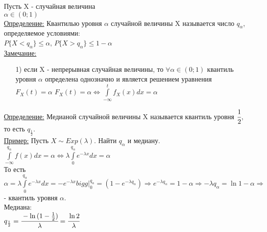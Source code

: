 

Пусть X - случайная величина\\
$\alpha \in (0;1)$\\

\underline{Определение:} Квантилью уровня $\alpha$ случайной величины X называется число $q_\alpha$, определяемое условиями:\\
$P\{X < q_\alpha\} \leqslant \alpha$, $P\{X > q_\alpha\} \leqslant 1 - \alpha$\\


\underline{Замечание:}\\
\begin{enumerate}
	\item[1)] если X - непрерывная случайная величины, то $\forall \alpha \in (0;1)$ квантиль уровня $\alpha$ определена однозначно и является решением уравнения\\
	$F_X(t) = \alpha$
	$\displaystyle  F_X(t) = \alpha \Leftrightarrow \int\limits_{-\infty}^t f_X(x) dx = \alpha$\\
\end{enumerate}


\underline{Определение:} Медианой случайной величины X называется квантиль уровня $\cfrac12$, то есть $q_{\frac12}$.\\


\underline{Пример:} Пусть $X \sim Exp(\lambda)$. Найти $q_\alpha$ и медиану.\\
$\displaystyle  \int\limits_{-\infty}^{q_\alpha} f(x) dx = \alpha \Leftrightarrow \lambda \int\limits_0^{q_\alpha} e^{-\lambda x} dx = \alpha$\\
То есть\\
$\displaystyle  \alpha = \lambda \int\limits_0^{q_\alpha} e^{-\lambda x} dx = - e^{-\lambda x} bigg|_0^{q_\alpha} = 
\left(1 - e^{-\lambda q_\alpha}\right) \Rightarrow e^{-\lambda q_\alpha} = 1 - \alpha \Rightarrow -\lambda q_\alpha = \ln{1 - \alpha} \Rightarrow$  - квантиль уровня $\alpha$.\\
Медиана:\\
$q_{\frac12} = \cfrac{-\ln{(1 - \frac12)}}{\lambda} = \cfrac{\ln{2}}{\lambda}$\\


















